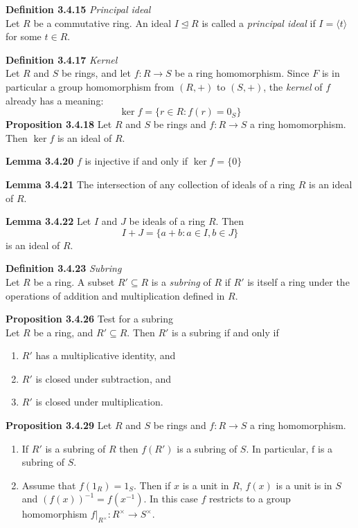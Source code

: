 \documentclass[8pt,landscape]{article}
\begin{document}
\begin{multicols}{3}
    \textbf{Definition 3.4.15} \emph{Principal ideal} \\
    Let $R$ be a commutative ring.
    An ideal $I \trianglelefteq R$ is called a \emph{principal ideal} if
    $I = \langle t \rangle$ for some $t \in R$.

    \textbf{Definition 3.4.17} \emph{Kernel} \\
    Let $R$ and $S$ be rings, and let $f : R \to S$ be a ring homomorphism.
    Since $F$ is in particular a group homomorphism from $(R,+)$ to $(S,+)$,
    the \emph{kernel} of $f$ already has a meaning:
    \[
        \ker f = \{ r \in R : f(r) = 0_S \}
    \]
    \textbf{Proposition 3.4.18}
    Let $R$ and $S$ be rings and $f : R \to S$ a ring homomorphism.
    Then $\ker f$ is an ideal of $R$.

    \textbf{Lemma 3.4.20} $f$ is injective if and only if $\ker f = \{0\}$

    \textbf{Lemma 3.4.21} The intersection of any collection of ideals of a ring $R$
    is an ideal of $R$.

    \textbf{Lemma 3.4.22} Let $I$ and $J$ be ideals of a ring $R$.
    Then
    \[
        I + J = \{a + b : a \in I, b \in J \}
    \]
    is an ideal of $R$.

    \textbf{Definition 3.4.23} \emph{Subring} \\
    Let $R$ be a ring.
    A subset $R' \subseteq R$ is a \emph{subring} of $R$ if $R'$ is itself a ring under the
    operations of addition and multiplication defined in $R$.

    \textbf{Proposition 3.4.26} Test for a subring \\
    Let $R$ be a ring, and $R' \subseteq R$.
    Then $R'$ is a subring if and only if
    \begin{enumerate}
        \item $R'$ has a multiplicative identity, and
        \item $R'$ is closed under subtraction, and
        \item $R'$ is closed under multiplication.
    \end{enumerate}

    \textbf{Proposition 3.4.29} Let $R$ and $S$ be rings and $f : R \to S$
    a ring homomorphism.
    \begin{enumerate}
        \item If $R'$ is a subring of $R$ then $f(R')$ is a subring of $S$.
            In particular, $\mathrm{f}$ is a subring of $S$.
        \item Assume that $f(1_R) = 1_S$.
            Then if $x$ is a unit in $R$, $f(x)$ is a unit is in $S$ and
            ${(f(x))}^{-1} = f{(x^{-1})}$.
            In this case $f$ restricts to a group homomorphism
            $f|_{R^\times} : R^\times \to S^\times$.
    \end{enumerate}


\end{multicols}
\end{document}
